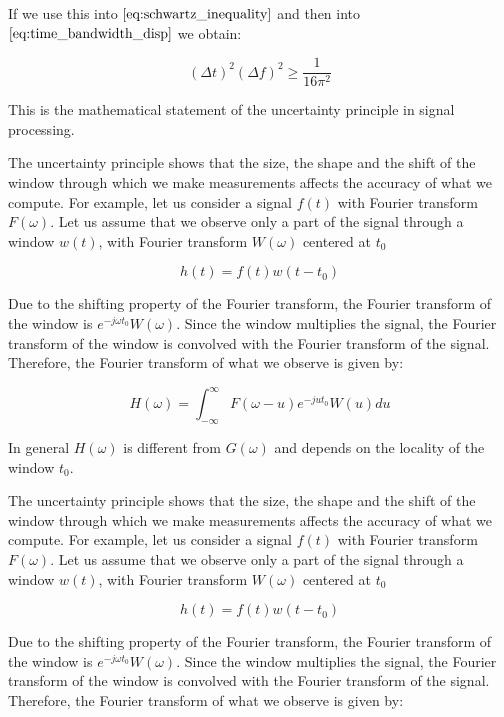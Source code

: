 If we use this into $\eqref{eq:schwartz_inequality}$ and then into $\eqref{eq:time_bandwidth_disp}$ we obtain:

\begin{equation}\label{eq:}
   (\Delta t)^2(\Delta f)^2 \geq \frac{1}{16\pi^{2}} 
\end{equation}

This is the mathematical statement of the uncertainty principle in signal processing.

The uncertainty principle shows that the size, the shape and the shift of the window through which we make measurements affects the accuracy of what we compute. For example, let us consider a signal $f(t)$ with Fourier transform $F(\omega)$. Let us assume that we observe only a part of the signal through a window $w(t)$, with Fourier transform $W(\omega)$ centered at $t_0$

\begin{equation}\label{eq:uncertainty_principle2}
    h(t) = f(t)w(t-t_0)
\end{equation}


Due to the shifting property of the Fourier transform, the Fourier transform of the window is $e^{-j\omega t_0}W(\omega)$. Since the window multiplies the signal, the Fourier transform of the window is convolved with the Fourier transform of the signal. Therefore, the Fourier transform of what we observe is given by:

\begin{equation}\label{eq:short_time_fourier_transform}
    H(\omega) = \int_{-\infty}^{\infty}F(\omega - u)e^{-ju t_0}W(u) du
\end{equation}


In general $H(\omega)$ is different from $G(\omega)$ and depends on the locality of the window $t_0$.

The uncertainty principle shows that the size, the shape and the shift of the window through which we make measurements affects the accuracy of what we compute. For example, let us consider a signal $f(t)$ with Fourier transform $F(\omega)$. Let us assume that we observe only a part of the signal through a window $w(t)$, with Fourier transform $W(\omega)$ centered at $t_0$

\begin{equation}\label{eq:uncertainty_principle2}
    h(t) = f(t)w(t-t_0)
\end{equation}


Due to the shifting property of the Fourier transform, the Fourier transform of the window is $e^{-j\omega t_0}W(\omega)$. Since the window multiplies the signal, the Fourier transform of the window is convolved with the Fourier transform of the signal. Therefore, the Fourier transform of what we observe is given by:

